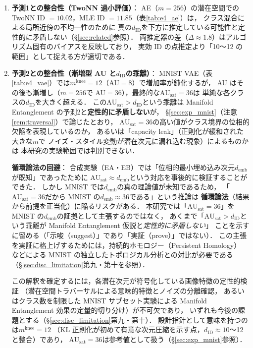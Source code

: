 \documentclass[12pt,a4paper]{jsarticle}
\newcommand{\dID}{d_{\mathrm{ID}}}
\newcommand{\AUsat}{\mathrm{AU}_{\mathrm{sat}}}
\newcommand{\mknee}{m^{\mathrm{knee}}}      %
\newcommand{\demb}{d_{\mathrm{emb}}}
\begin{document}
\begin{enumerate}
  \item \textbf{予測1との整合性（TwoNN 過小評価）}：
        AE（$m = 256$）の潜在空間での TwoNN ID $= 10.02$，MLE ID $= 11.85$（表\ref{tab:e4_ae}）は，
        クラス混合による局所近傍の不均一性\cite{pope2021intrinsic}のために
        真の$\dID$を下方に推定している可能性と定性的に矛盾しない（§\ref{sec:related}参照）．
        両推定器の差（$\Delta \approx 1.8$）はアルゴリズム固有のバイアスを反映しており，
        実効 ID の点推定より「10〜12 の範囲」として捉える方が適切である．

  \item \textbf{予測2との整合性（漸増型 AU と$\dID$の乖離）}：
        MNIST VAE（表\ref{tab:e4_vae}）では$\mknee = 12$（AU$=8$）で増加率が鈍化するが，
        AU はその後も漸増し（$m=256$で AU$=36$），最終的な$\AUsat = 36$は
        単純な各クラスの$\dID$を大きく超える．
        この$\AUsat > \dID$という乖離は Manifold Entanglement の予測2と\textbf{定性的に矛盾しない}が，
        §\ref{sec:exp_mnist}（注意\ref{rem:traversal}）で論じたとおり，
        $\AUsat = 36$の高い値がクラス境界の位相的欠陥を表現しているのか，
        あるいは「capacity leak」（正則化が緩和された大きな$m$で
        ノイズ・スタイル変動が潜在次元に漏れ込む現象）によるものかは
        本研究の実験範囲では判別できない．

        \textbf{循環論法の回避}：
        合成実験（EA・EB）では「位相的最小埋め込み次元$\demb$が既知」であったために
        $\AUsat \approx \demb$という対応を事後的に検証することができた．
        しかし MNIST では$\demb$の真の理論値が未知であるため，
        「$\AUsat = 36$だから MNIST の$\demb \approx 36$である」という推論は
        \textbf{循環論法}（結果から前提を正当化）に陥るリスクがある．
        本研究では「$\AUsat = 36$」を MNIST の$\demb$の証拠として主張するのではなく，
        あくまで「$\AUsat > \dID$という乖離が Manifold Entanglement 仮説と\textit{定性的に矛盾しない}」
        ことを示すに留める（「示唆（suggest）」であり「実証（prove）」ではない）．
        この主張を実証に格上げするためには，持続的ホモロジー（Persistent Homology）\cite{carlsson2009topology}
        などによる MNIST の独立したトポロジカル分析との対比が必要である
        （§\ref{sec:disc_limitation}第九・第十を参照）．

        この解釈を確定するには，各潜在次元が符号化している画像特徴の定性的検証
        （潜在空間トラバーサルによる意味的特徴とノイズの分離確認，
        あるいはクラス数を制限した MNIST サブセット実験による
        Manifold Entanglement 効果の定量的切り分け）が不可欠であり，
        いずれも今後の課題とする（§\ref{sec:disc_limitation}第九・第十）．
        設計指針として意味を持つのは$\mknee = 12$
        （KL 正則化が初めて有意な次元圧縮を示す点，$\dID \approx 10$〜12 と整合）であり，
        $\AUsat = 36$は参考値として扱う（§\ref{sec:exp_mnist}参照）．


\end{enumerate}
\end{document}
